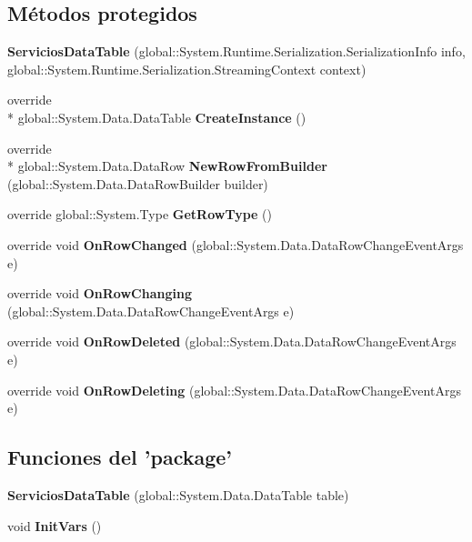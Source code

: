 \subsection*{Métodos protegidos}
\begin{DoxyCompactItemize}
\item 
{\bf Servicios\-Data\-Table} (global\-::\-System.\-Runtime.\-Serialization.\-Serialization\-Info info, global\-::\-System.\-Runtime.\-Serialization.\-Streaming\-Context context)
\item 
override \\*
global\-::\-System.\-Data.\-Data\-Table {\bf Create\-Instance} ()
\item 
override \\*
global\-::\-System.\-Data.\-Data\-Row {\bf New\-Row\-From\-Builder} (global\-::\-System.\-Data.\-Data\-Row\-Builder builder)
\item 
override global\-::\-System.\-Type {\bf Get\-Row\-Type} ()
\item 
override void {\bf On\-Row\-Changed} (global\-::\-System.\-Data.\-Data\-Row\-Change\-Event\-Args e)
\item 
override void {\bf On\-Row\-Changing} (global\-::\-System.\-Data.\-Data\-Row\-Change\-Event\-Args e)
\item 
override void {\bf On\-Row\-Deleted} (global\-::\-System.\-Data.\-Data\-Row\-Change\-Event\-Args e)
\item 
override void {\bf On\-Row\-Deleting} (global\-::\-System.\-Data.\-Data\-Row\-Change\-Event\-Args e)
\end{DoxyCompactItemize}
\subsection*{Funciones del 'package'}
\begin{DoxyCompactItemize}
\item 
{\bf Servicios\-Data\-Table} (global\-::\-System.\-Data.\-Data\-Table table)
\item 
void {\bf Init\-Vars} ()
\end{DoxyCompactItemize}
